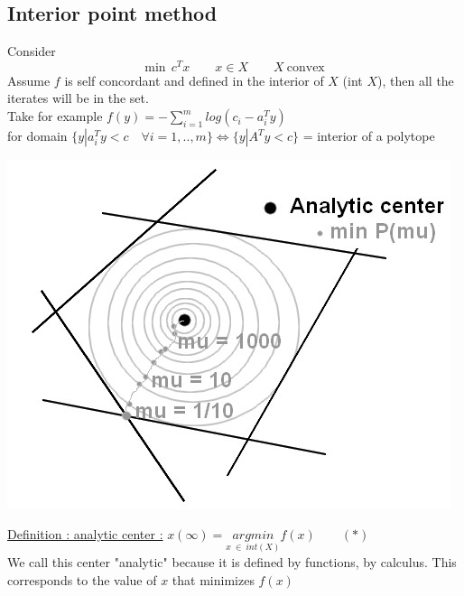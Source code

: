 \documentclass[10pt,a4paper]{article}
\begin{document}
\subsection{Interior point method}
Consider 
$$ \text{min} ~~ c^T x \qquad x \in X \qquad X \ \text{convex}$$
Assume $f$ is self concordant and defined in the interior of $X$ (int $X$), then all the iterates will be in the set.\\
Take for example $f(y) = - \sum_{i = 1}^m log(c_i - a_i^T y)$\\ for domain $\lbrace y | a_i^T y < c\quad \forall i = 1,..,m \rbrace \Longleftrightarrow \lbrace y | A^T y < c  \rbrace$ = interior of a polytope\\
\begin{center}
\includegraphics[scale=0.5]{fig1.jpg} 
\end{center}

\underline{Definition : analytic center :} $x(\infty) = \underset{x\ \in \ int(X)}{arg min} f(x) \qquad (*)$  \\
We call this center "analytic" because it is defined by functions, by calculus. This corresponds to the value of $x$ that minimizes $f(x)$
\end{document}
